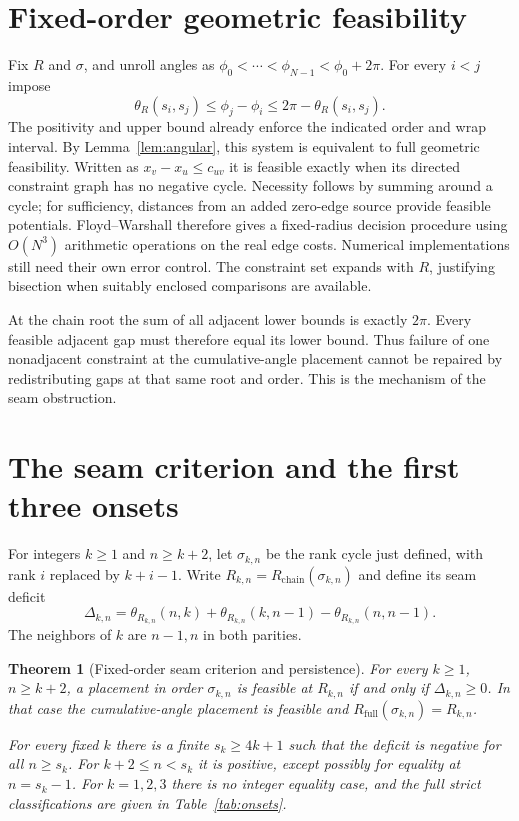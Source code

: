 \documentclass[11pt]{article}
\newtheorem{theorem}{Theorem}[section]
\theoremstyle{definition}
\theoremstyle{remark}
\newcommand{\Rchain}{R_{\mathrm{chain}}}
\newcommand{\Rfull}{R_{\mathrm{full}}}
\begin{document}
\section{Fixed-order geometric feasibility}\label{sec:fixed}
Fix $R$ and $\sigma$, and unroll angles as
$\phi_0<\cdots<\phi_{N-1}<\phi_0+2\pi$. For every $i<j$ impose
\begin{equation}\label{eq:difference}
 \theta_R(s_i,s_j)\le\phi_j-\phi_i
 \le2\pi-\theta_R(s_i,s_j).
\end{equation}
The positivity and upper bound already enforce the indicated order and
wrap interval. By Lemma~\ref{lem:angular}, this system is equivalent to
full geometric feasibility. Written as $x_v-x_u\le c_{uv}$ it is
feasible exactly when its directed constraint graph has no negative cycle.
Necessity follows by summing around a cycle; for sufficiency, distances
from an added zero-edge source provide feasible potentials. Floyd--Warshall
therefore gives a fixed-radius decision procedure using $O(N^3)$ arithmetic
operations on the real edge costs. Numerical implementations still need
their own error control. The constraint set expands with $R$, justifying
bisection when suitably enclosed comparisons are available.

At the chain root the sum of all adjacent lower bounds is exactly $2\pi$.
Every feasible adjacent gap must therefore equal its lower bound. Thus
failure of one nonadjacent constraint at the cumulative-angle placement
cannot be repaired by redistributing gaps at that same root and order.
This is the mechanism of the seam obstruction.

\section{The seam criterion and the first three onsets}\label{sec:seam}
For integers $k\ge1$ and $n\ge k+2$, let $\sigma_{k,n}$ be the
rank cycle just defined, with rank $i$ replaced by $k+i-1$. Write
$R_{k,n}=\Rchain(\sigma_{k,n})$ and define its seam deficit
\begin{equation}\label{eq:seam-main}
 \Delta_{k,n}=\theta_{R_{k,n}}(n,k)+\theta_{R_{k,n}}(k,n-1)
                    -\theta_{R_{k,n}}(n,n-1).
\end{equation}
The neighbors of $k$ are $n-1,n$ in both parities.

\begin{theorem}[Fixed-order seam criterion and persistence]\label{thm:seam}
For every $k\ge1$, $n\ge k+2$, a placement in order $\sigma_{k,n}$
is feasible at $R_{k,n}$ if and only if $\Delta_{k,n}\ge0$.
In that case the cumulative-angle placement is feasible and
$\Rfull(\sigma_{k,n})=R_{k,n}$.

For every fixed $k$ there is a finite $s_k\ge4k+1$ such that the
deficit is negative for all $n\ge s_k$. For $k+2\le n<s_k$ it is
positive, except possibly for equality at $n=s_k-1$. For $k=1,2,3$
there is no integer equality case, and the full strict classifications
are given in Table~\ref{tab:onsets}.
\end{theorem}
\end{document}
